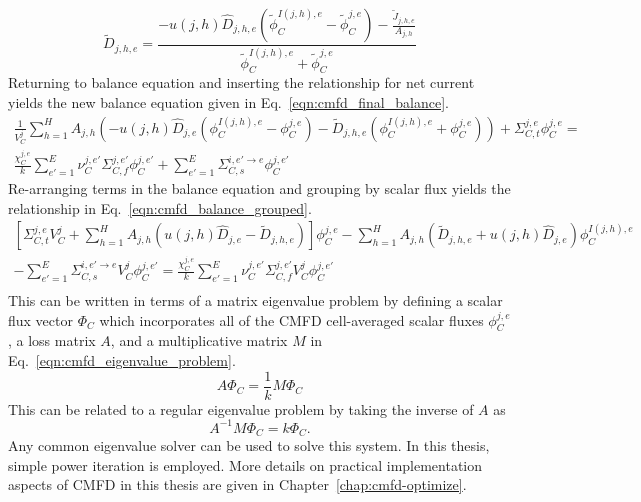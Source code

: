 \begin{equation}
	\tilde{D}_{j,h,e} = \frac{-u(j, h) \hat{D}_{j,h,e} \left(\tilde{\phi}_C^{I(j,h),e} - \tilde{\phi}_C^{j,e}\right) - \frac{\tilde{J}_{j,h,e}}{A_{j,h}}}{\tilde{\phi}_C^{I(j,h),e} + \tilde{\phi}_C^{j,e}}
	\label{eqn:cmfd_corr_dif_coef}
\end{equation}
Returning to balance equation and inserting the relationship for net current yields the new balance equation given in Eq.~\ref{eqn:cmfd_final_balance}.
\begin{equation}
\begin{split}
	\frac{1}{V_C^j} \sum_{h=1}^H A_{j,h} \left( - u(j, h) \hat{D}_{j,e} \left(\phi_C^{I(j,h),e} - \phi_C^{j,e}\right) - \tilde{D}_{j,h,e} \left(\phi_C^{I(j,h),e} + \phi_C^{j,e}\right) \right) + \Sigma_{C,t}^{j,e} \phi_C^{j,e} = \\
	\frac{\chi_C^{j,e}}{k} \sum_{e'=1}^{E} \nu_C^{j, e'} \Sigma_{C,f}^{j,e'} \phi_C^{j,e'} + \sum_{e'=1}^E  \Sigma_{C,s}^{i, e' \rightarrow e} \phi_C^{j,e'}
\end{split}
\end{equation}
Re-arranging terms in the balance equation and grouping by scalar flux yields the relationship in Eq.~\ref{eqn:cmfd_balance_grouped}.
\begin{equation}
	\begin{split}
		\left[\Sigma_{C,t}^{j,e} V_C^j + \sum_{h=1}^H A_{j,h} \left(u(j,h) \hat{D}_{j,e} - \tilde{D}_{j,h,e} \right) \right] \phi_C^{j,e} - \sum_{h=1}^H A_{j,h} \left( \tilde{D}_{j,h,e} + u(j,h) \hat{D}_{j,e} \right) \phi_C^{I(j,h),e} & \\ - \sum_{e'=1}^E  \Sigma_{C,s}^{i, e' \rightarrow e} V_C^j \phi_C^{j,e'} =
		\frac{\chi_C^{j,e}}{k} \sum_{e'=1}^{E} \nu_C^{j, e'} \Sigma_{C,f}^{j,e'} V_C^j \phi_C^{j,e'} & \\
	\end{split}
	\label{eqn:cmfd_balance_grouped}
\end{equation}
This can be written in terms of a matrix eigenvalue problem by defining a scalar flux vector $\Phi_C$ which incorporates all of the CMFD cell-averaged scalar fluxes $\phi_C^{j,e}$, a loss matrix $A$, and a multiplicative matrix $M$ in Eq.~\ref{eqn:cmfd_eigenvalue_problem}.
\begin{equation}
	A \Phi_C = \frac{1}{k} M \Phi_C
	\label{eqn:cmfd_eigenvalue_problem}
\end{equation}
This can be related to a regular eigenvalue problem by taking the inverse of $A$ as
\begin{equation}
	A^{-1} M \Phi_C = k \Phi_C.
\end{equation}
Any common eigenvalue solver can be used to solve this system. In this thesis, simple power iteration is employed. More details on practical implementation aspects of CMFD in this thesis are given in Chapter~\ref{chap:cmfd-optimize}.

